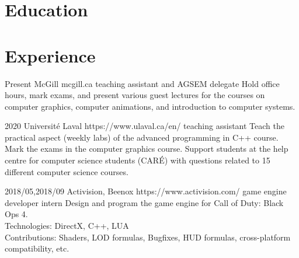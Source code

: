 \documentclass[10pt]{article} %
\begin{document}
\section{Education}







\section{Experience}
\job
{}{Present}
{McGill}
{mcgill.ca}
{teaching assistant and AGSEM delegate}
{Hold office hours, mark exams, and present various guest lectures for the courses on computer graphics, computer animations, and introduction to computer systems.}

\job
{}{2020}
{Université Laval}
{https://www.ulaval.ca/en/}
{teaching assistant}
{Teach the practical aspect (weekly labs) of the advanced programming in C++ course. Mark the exams in the computer graphics course. Support students at the help centre for computer science students (CARÉ) with questions related to 15 different computer science courses.}

\job
{2018/05,}{2018/09}
{Activision, Beenox}
{https://www.activision.com/}
{game engine developer intern}
{Design and program the game engine for Call of Duty: Black Ops 4.\\
 Technologies: DirectX, C++, LUA \\
 Contributions: Shaders, LOD formulas, Bugfixes, HUD formulas, cross-platform compatibility, etc.}
\end{document}
